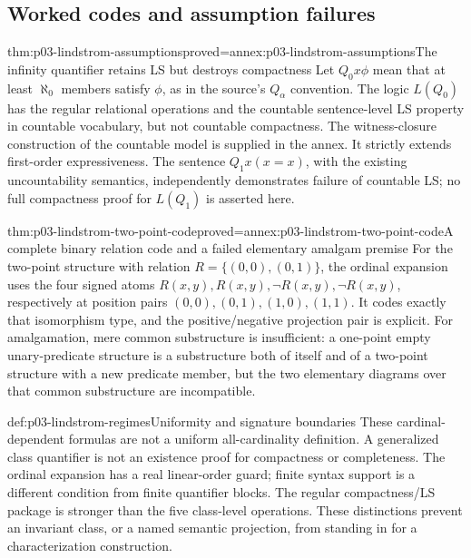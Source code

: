 \subsection{Worked codes and assumption failures}

\begin{hbtheorem}{thm:p03-lindstrom-assumptions}{proved=annex:p03-lindstrom-assumptions}{The infinity quantifier retains LS but destroys compactness}
Let \(Q_0x\phi\) mean that at least \(\aleph_0\) members satisfy
\(\phi\), as in the source's \(Q_\alpha\) convention. The logic
\(L(Q_0)\) has the regular relational operations and the countable
sentence-level LS property in countable vocabulary, but not countable
compactness. The witness-closure construction of the countable model
is supplied in the annex. It strictly extends first-order expressiveness.
The sentence \(Q_1x(x=x)\), with the existing uncountability semantics,
independently demonstrates failure of countable LS; no full compactness
proof for \(L(Q_1)\) is asserted here.
\end{hbtheorem}

\begin{hbtheorem}{thm:p03-lindstrom-two-point-code}{proved=annex:p03-lindstrom-two-point-code}{A complete binary relation code and a failed elementary amalgam premise}
For the two-point structure with relation
\(R=\{(0,0),(0,1)\}\), the ordinal expansion uses the four signed
atoms \(R(x,y),R(x,y),\neg R(x,y),\neg R(x,y)\), respectively
at position pairs \((0,0),(0,1),(1,0),(1,1)\). It codes exactly that
isomorphism type, and the positive/negative projection pair is explicit.
For amalgamation, mere common substructure is insufficient: a one-point
empty unary-predicate structure is a substructure both of itself and of
a two-point structure with a new predicate member, but the two elementary
diagrams over that common substructure are incompatible.
\end{hbtheorem}

\begin{proofboundary}{def:p03-lindstrom-regimes}{Uniformity and signature boundaries}
These cardinal-dependent formulas are not a uniform all-cardinality
definition. A generalized class quantifier is not an existence proof for
compactness or completeness. The ordinal expansion has a real linear-order
guard; finite syntax support is a different condition from finite quantifier
blocks. The regular compactness/LS package is stronger than the five
class-level operations. These distinctions prevent an invariant class,
or a named semantic projection, from standing in for a characterization
construction.
\end{proofboundary}
